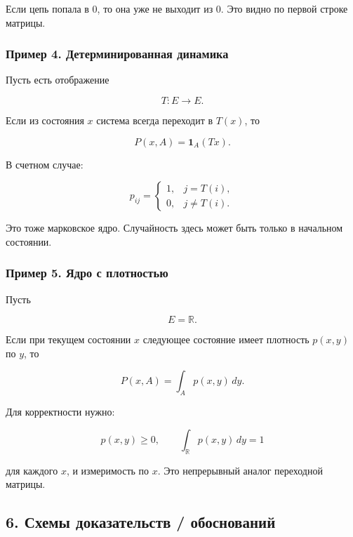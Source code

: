 \documentclass[
  11pt,
  a4paper,
]{article}
\begin{document}
Если цепь попала в \(0\), то она уже не выходит из \(0\). Это видно по
первой строке матрицы.

\subsubsection{Пример 4. Детерминированная
динамика}\label{ux43fux440ux438ux43cux435ux440-4.-ux434ux435ux442ux435ux440ux43cux438ux43dux438ux440ux43eux432ux430ux43dux43dux430ux44f-ux434ux438ux43dux430ux43cux438ux43aux430}

Пусть есть отображение

\[
T:E\to E.
\]

Если из состояния \(x\) система всегда переходит в \(T(x)\), то

\[
P(x,A)=\mathbf 1_A(Tx).
\]

В счетном случае:

\[
p_{ij}=
\begin{cases}
1, & j=T(i),\\
0, & j\ne T(i).
\end{cases}
\]

Это тоже марковское ядро. Случайность здесь может быть только в
начальном состоянии.

\subsubsection{Пример 5. Ядро с
плотностью}\label{ux43fux440ux438ux43cux435ux440-5.-ux44fux434ux440ux43e-ux441-ux43fux43bux43eux442ux43dux43eux441ux442ux44cux44e}

Пусть

\[
E=\mathbb R.
\]

Если при текущем состоянии \(x\) следующее состояние имеет плотность
\(p(x,y)\) по \(y\), то

\[
P(x,A)=\int_A p(x,y)\,dy.
\]

Для корректности нужно:

\[
p(x,y)\ge0,
\qquad
\int_{\mathbb R}p(x,y)\,dy=1
\]

для каждого \(x\), и измеримость по \(x\). Это непрерывный аналог
переходной матрицы.

\subsection{6. Схемы доказательств /
обоснований}\label{ux441ux445ux435ux43cux44b-ux434ux43eux43aux430ux437ux430ux442ux435ux43bux44cux441ux442ux432-ux43eux431ux43eux441ux43dux43eux432ux430ux43dux438ux439}
\end{document}
